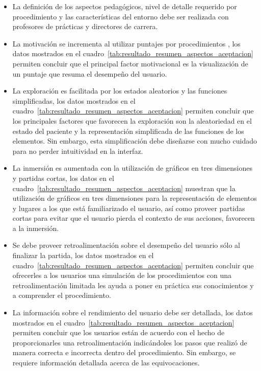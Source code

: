 \begin{itemize}


\item La definición de los aspectos pedagógicos, nivel de detalle requerido por
    procedimiento y las características del entorno debe ser realizada con
    profesores de prácticas y directores de carrera.

\item La motivación se incrementa al utilizar puntajes por procedimientos , los
    datos mostrados en el cuadro~\ref{tab:resultado_resumen_aspectos_aceptacion}
    permiten concluir que el principal factor motivacional es la visualización
    de un puntaje que resuma el desempeño del usuario. 

\item La exploración es facilitada por los estados aleatorios y las funciones 
	simplificadas, los datos mostrados en el
    cuadro~\ref{tab:resultado_resumen_aspectos_aceptacion} permiten concluir que
    los principales factores que favorecen la exploración son la aleatoriedad en
    el estado del paciente y la representación simplificada de las funciones de
    los elementos. Sin embargo, esta simplificación debe diseñarse con mucho
    cuidado para no perder intuitividad en la interfaz. 

\item La inmersión es aumentada con la utilización de gráficos en tres dimensiones 
	y partidas cortas, los datos en el
    cuadro~\ref{tab:resultado_resumen_aspectos_aceptacion} muestran que la
    utilización de gráficos en tres dimensiones para la representación de
    elementos y lugares a los que está familiarizado el usuario, así como
    proveer partidas cortas para evitar que el usuario pierda el contexto de sus
    acciones, favorecen a la inmersión. 

\item Se debe proveer retroalimentación sobre el desempeño del usuario sólo al
    finalizar la partida, los datos mostrados en el
    cuadro~\ref{tab:resultado_resumen_aspectos_aceptacion} permiten concluir que
    ofrecerles a los usuarios una simulación de los procedimientos con una
    retroalimentación limitada les ayuda a poner en práctica sus conocimientos y
    a comprender el procedimiento. 

\item La información sobre el rendimiento del usuario debe ser detallada, los
    datos mostrados en el cuadro~\ref{tab:resultado_resumen_aspectos_aceptacion}
    permiten concluir que los usuarios están de acuerdo con el hecho de
    proporcionarles una retroalimentación indicándoles los pasos que realizó de
    manera correcta e incorrecta dentro del procedimiento. Sin embargo, se requiere 
    información detallada acerca de las equivocaciones.
    

\end{itemize}
